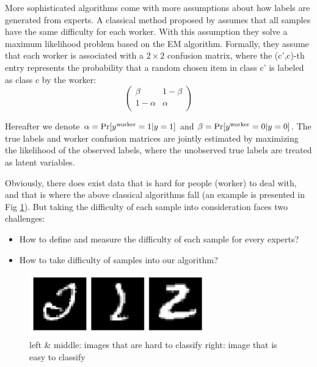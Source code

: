 \documentclass{article}
\begin{document}
More sophisticated algorithms come with more assumptions about how labels are generated from experts. A classical method proposed by \cite{dawid1979maximum} assumes that all samples have the same difficulty for each worker. With this assumption they solve a maximum likelihood problem based on the EM algorithm. Formally, they assume that each worker is associated with a $2\times 2$ confusion matrix, where the (c',c)-th entry represents the probability that a random chosen item in class c' is labeled as class c by the worker: 
\begin{displaymath}
\left( \begin{array}{cc}
\beta & 1-\beta \\
1-\alpha & \alpha  \\
\end{array} \right)
\end{displaymath}

Hereafter we denote $\alpha=\textup{Pr}[y^{\mathrm{worker}}=1|y=1]$ and $\beta=\textup{Pr}[y^{\mathrm{worker}}=0|y=0]$. 
The true labels and worker confusion matrices are jointly estimated by maximizing the likelihood of the observed labels, where the unobserved true labels are treated as latent variables.


Obviously, there does exist data that is hard for people (worker) to deal with, and that is where the above classical algorithms fall (an example is presented in Fig \ref{fig:MNIST_confused_example1}). But taking the difficulty of each sample into consideration faces two challenges:
\begin{itemize}
    \item How to define and measure the difficulty of each sample for every experts?
    \item How to take difficulty of samples into our algorithm?
\end{itemize}

\begin{figure}[H]
    \centering
    \includegraphics[width=3in]{image/MNIST_confused_example1.png}
    \caption{left \& middle: images that are hard to classify \quad right: image that is easy to classify} 
    \label{fig:MNIST_confused_example1}
\end{figure}
\end{document}
